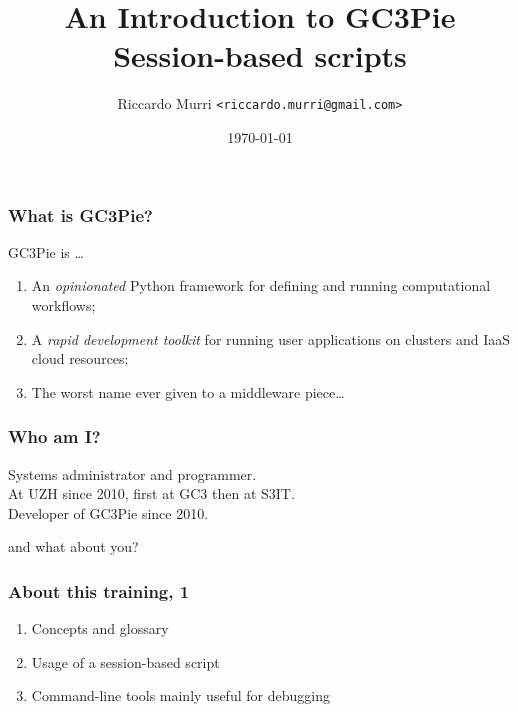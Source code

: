 \documentclass[english,serif,mathserif,usenames,dvipsnames]{beamer}
\begin{document}
\title[GC3Pie Tools]{An Introduction to GC3Pie Session-based scripts}
\author{Riccardo Murri \texttt{<riccardo.murri@gmail.com>}}
\date{\today}

\maketitle

%

\begin{frame}
  \frametitle{What is GC3Pie?}
  GC3Pie is \ldots
  \begin{enumerate}
  \item An \emph{opinionated} Python framework for defining and running computational workflows;
  \item \alert<2>{A \emph{rapid development toolkit} for running user applications on clusters and IaaS cloud resources;}
  \item The worst name ever given to a middleware piece\ldots
  \end{enumerate}

  \+
\end{frame}


\begin{frame}
  \frametitle{Who am I?}
  \begin{center}
    Systems administrator and programmer.
    \\ \+
    At UZH since 2010, first at GC3 then at S3IT.
    \\ \+
    Developer of GC3Pie since 2010.
  \end{center}
\end{frame}


\begin{frame}
  \begin{center}
    {\Huge and what about you?}
  \end{center}
\end{frame}


\begin{frame}
  \frametitle{About this training, 1}
  \begin{enumerate}
  \item Concepts and glossary
  \item Usage of a session-based script
  \item Command-line tools mainly useful for debugging
  \end{enumerate}
\end{frame}
\end{document}
